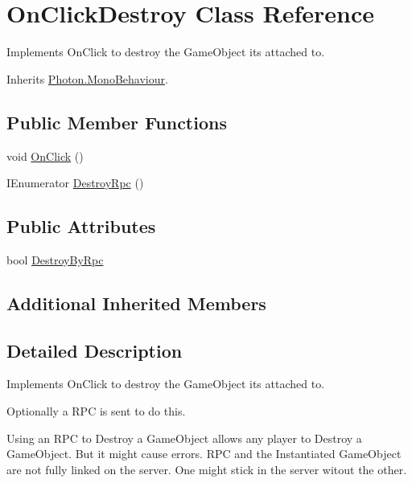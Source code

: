 \hypertarget{class_on_click_destroy}{}\section{On\+Click\+Destroy Class Reference}
\label{class_on_click_destroy}


Implements On\+Click to destroy the Game\+Object it\textquotesingle{}s attached to.  




Inherits \hyperlink{class_photon_1_1_mono_behaviour}{Photon.\+Mono\+Behaviour}.

\subsection*{Public Member Functions}
\begin{DoxyCompactItemize}
\item 
void \hyperlink{class_on_click_destroy_ad6050d0a7dac6afab6063ca7b94c317c}{On\+Click} ()
\item 
I\+Enumerator \hyperlink{class_on_click_destroy_aa4c9d02e0298626789a0c58640ecb827}{Destroy\+Rpc} ()
\end{DoxyCompactItemize}
\subsection*{Public Attributes}
\begin{DoxyCompactItemize}
\item 
bool \hyperlink{class_on_click_destroy_ac2047f6e4afd9f42f366c09b7ffd7570}{Destroy\+By\+Rpc}
\end{DoxyCompactItemize}
\subsection*{Additional Inherited Members}


\subsection{Detailed Description}
Implements On\+Click to destroy the Game\+Object it\textquotesingle{}s attached to. 

Optionally a R\+PC is sent to do this. 

Using an R\+PC to Destroy a Game\+Object allows any player to Destroy a Game\+Object. But it might cause errors. R\+PC and the Instantiated Game\+Object are not fully linked on the server. One might stick in the server witout the other.

